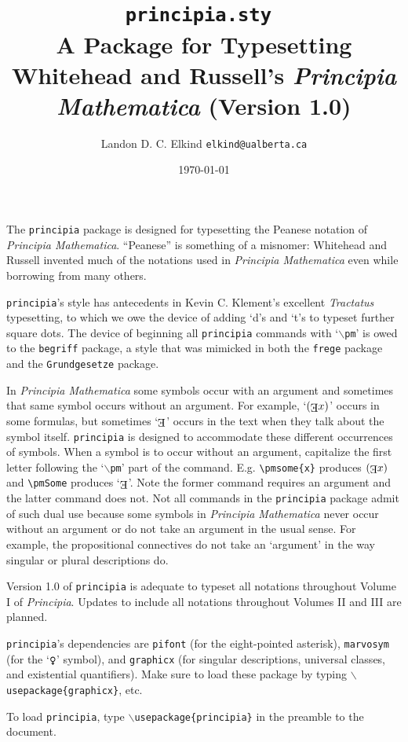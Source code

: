 \documentclass[12pt]{article}
\title{\texttt{principia.sty }\\ A \LaTeXe \space Package for Typesetting Whitehead and Russell's \textit{Principia Mathematica} (Version 1.0)}
\author{Landon D. C. Elkind \texttt{elkind@ualberta.ca}}
\date{\today}
\begin{document}
\maketitle
\onehalfspacing
The \texttt{principia} package is designed for typesetting the Peanese notation of \textit{Principia Mathematica}. ``Peanese'' is something of a misnomer: Whitehead and Russell invented much of the notations used in \textit{Principia Mathematica} even while borrowing from many others.

\texttt{principia}'s style has antecedents in Kevin C. Klement's excellent \textit{Tractatus} typesetting, to which we owe the device of adding `d's and `t's to typeset further square dots. The device of beginning all \texttt{principia} commands with `\texttt{$\backslash$pm}' is owed to the \texttt{begriff} package, a style that was mimicked in both the \texttt{frege} package and the \texttt{Grundgesetze} package. 

In \textit{Principia Mathematica} some symbols occur with an argument and sometimes that same symbol occurs without an argument. For example, `$\pmsome{x}$' occurs in some formulas, but sometimes `$\pmSome$' occurs in the text when they talk about the symbol itself. \texttt{principia} is designed to accommodate these different occurrences of symbols. When a symbol is to occur without an argument, capitalize the first letter following the `\texttt{$\backslash$pm}' part of the command. E.g. \verb|\pmsome{x}| produces $\pmsome{x}$ and \verb|\pmSome| produces `$\pmSome$'. Note the former command requires an argument and the latter command does not. Not all commands in the \texttt{principia} package admit of such dual use because some symbols in \textit{Principia Mathematica} never occur without an argument or do not take an argument in the usual sense. For example, the propositional connectives do not take an `argument' in the way singular or plural descriptions do.

Version 1.0 of \texttt{principia} is adequate to typeset all notations throughout Volume I of \textit{Principia}. Updates to include all notations throughout Volumes II and III are planned.

\texttt{principia}'s dependencies are \texttt{pifont} (for the eight-pointed asterisk), \texttt{marvosym} (for the `$\pmop$' symbol), and \texttt{graphicx} (for singular descriptions, universal classes, and existential quantifiers). Make sure to load these package by typing \texttt{$\backslash$usepackage\{graphicx\}}, etc. 

To load \texttt{principia}, type \texttt{$\backslash$usepackage\{principia\}} in the preamble to the document.
\end{document}
